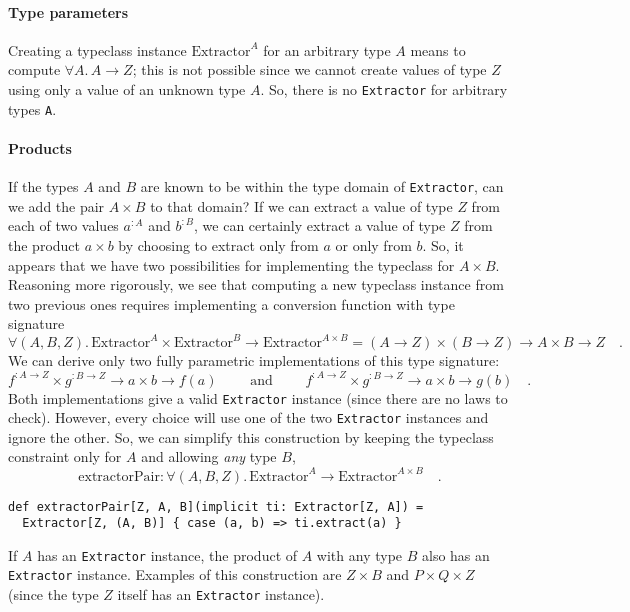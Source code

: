 \paragraph{Type parameters}

Creating a typeclass instance $\text{Extractor}^{A}$ for an arbitrary
type $A$ means to compute $\forall A.\,A\rightarrow Z$; this is
not possible since we cannot create values of type $Z$ using only
a value of an unknown type $A$. So, there is no \lstinline!Extractor!
for arbitrary types \lstinline!A!.

\paragraph{Products}

If the types $A$ and $B$ are known to be within the type domain
of \lstinline!Extractor!, can we add the pair $A\times B$ to that
domain? If we can extract a value of type $Z$ from each of two values
$a^{:A}$ and $b^{:B}$, we can certainly extract a value of type
$Z$ from the product $a\times b$ by choosing to extract only from
$a$ or only from $b$. So, it appears that we have two possibilities
for implementing the typeclass for $A\times B$. Reasoning more rigorously,
we see that computing a new typeclass instance from two previous ones
requires implementing a conversion function with type signature
\[
\forall(A,B,Z).\,\text{Extractor}^{A}\times\text{Extractor}^{B}\rightarrow\text{Extractor}^{A\times B}=\left(A\rightarrow Z\right)\times\left(B\rightarrow Z\right)\rightarrow A\times B\rightarrow Z\quad.
\]
We can derive only two fully parametric implementations of this type
signature: 
\[
f^{:A\rightarrow Z}\times g^{:B\rightarrow Z}\rightarrow a\times b\rightarrow f(a)\quad\quad\text{ and }\quad\quad f^{:A\rightarrow Z}\times g^{:B\rightarrow Z}\rightarrow a\times b\rightarrow g(b)\quad.
\]
Both implementations give a valid \lstinline!Extractor! instance
(since there are no laws to check). However, every choice will use
one of the two \lstinline!Extractor! instances and ignore the other.
So, we can simplify this construction by keeping the typeclass constraint
only for $A$ and allowing \emph{any} type $B$,
\[
\text{extractorPair}:\forall(A,B,Z).\,\text{Extractor}^{A}\rightarrow\text{Extractor}^{A\times B}\quad.
\]
\begin{lstlisting}
def extractorPair[Z, A, B](implicit ti: Extractor[Z, A]) =
  Extractor[Z, (A, B)] { case (a, b) => ti.extract(a) }
\end{lstlisting}
If $A$ has an \lstinline!Extractor! instance, the product of $A$
with any type $B$ also has an \lstinline!Extractor! instance. Examples
of this construction are $Z\times B$ and $P\times Q\times Z$ (since
the type $Z$ itself has an \lstinline!Extractor! instance).


